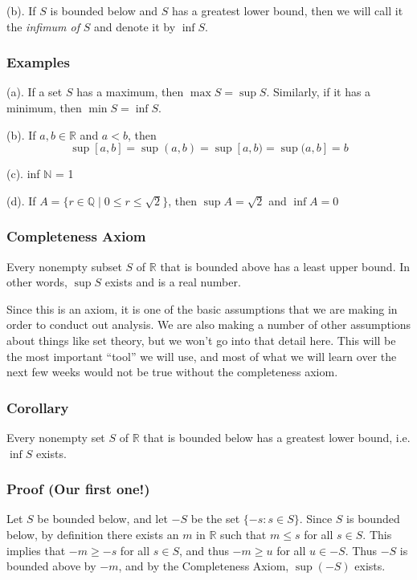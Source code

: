 \documentclass[]{article}
\begin{document}
(b). If $S$ is bounded below and $S$ has a greatest lower bound, then we
will call it the \emph{infimum of} $S$ and denote it by $\inf S$.

\subsubsection{Examples}

(a). If a set $S$ has a maximum, then $\max S = \sup S$. Similarly, if
it has a minimum, then $\min S = \inf S$.

(b). If $a,b \in \mathbb{R}$ and $a < b$, then
\[ \sup [a,b] = \sup(a,b) = \sup[a,b) = \sup(a,b] = b \]

(c). inf $\mathbb{N}$ = 1

(d). If $A = \{r \in \mathbb{Q} \mid 0 \le r \le \sqrt{2} \}$, then
$\sup A = \sqrt{2}$ and $\inf A = 0$

\subsubsection{Completeness Axiom}

Every nonempty subset $S$ of $\mathbb{R}$ that is bounded above has a
least upper bound. In other words, $\sup S$ exists and is a real number.

Since this is an axiom, it is one of the basic assumptions that we are
making in order to conduct out analysis. We are also making a number of
other assumptions about things like set theory, but we won't go into
that detail here. This will be the most important ``tool'' we will use,
and most of what we will learn over the next few weeks would not be true
without the completeness axiom.

\subsubsection{Corollary}

Every nonempty set $S$ of $\mathbb{R}$ that is bounded below has a
greatest lower bound, i.e. $\inf S$ exists.

\subsubsection{Proof (Our first one!)}

Let $S$ be bounded below, and let $-S$ be the set $\{-s : s \in S\}$.
Since $S$ is bounded below, by definition there exists an $m$ in
$\mathbb{R}$ such that $m \le s$ for all $s \in S$. This implies that
$-m \ge -s$ for all $s \in S$, and thus $-m \ge u$ for all $u \in -S$.
Thus $-S$ is bounded above by $-m$, and by the Completeness Axiom,
$\sup(-S)$ exists.
\end{document}
